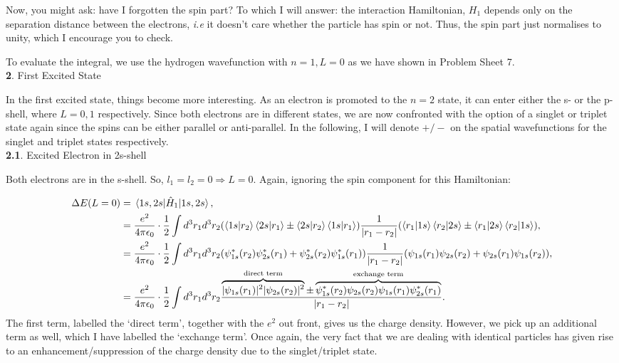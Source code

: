 \documentclass{article}
\numberwithin{equation}{section} %
\begin{document}
Now, you might ask: have I forgotten the spin part? To which I will answer: the interaction Hamiltonian, $H_1$ depends only on the separation distance between the electrons, \textit{i.e} it doesn't care whether the particle has spin or not. Thus, the spin part just normalises to unity, which I encourage you to check.

To evaluate the integral, we use the hydrogen wavefunction with $n=1, L=0$ as we have shown in Problem Sheet 7.\\

\noindent\textbf{2}. First Excited State

In the first excited state, things become more interesting. As an electron is promoted to the $n=2$ state, it can enter either the s- or the p-shell, where $L=0, 1$ respectively. Since both electrons are in different states, we are now confronted with the option of a singlet or triplet state again since the spins can be either parallel or anti-parallel. In the following, I will denote $+/-$ on the spatial wavefunctions for the singlet and triplet states respectively. \\

\noindent\textbf{2.1}. Excited Electron in 2s-shell

Both electrons are in the s-shell. So, $l_1=l_2=0 \Rightarrow L=0$. Again, ignoring the spin component for this Hamiltonian:

\begin{equation}
\begin{split}
\Delta E(L=0) &=\mel{1s,2s}{\hat{H}_1}{1s,2s},\\
&=\frac{e^2}{4\pi\epsilon_0}\cdot \frac{1}{2}\int d^3r_1d^3r_2 (\bra{1s}\ket{r_2}\bra{2s}\ket{r_1} \pm \bra{2s}\ket{r_2}\bra{1s}\ket{r_1})\frac{1}{\vert r_1-r_2\vert}(\bra{r_1}\ket{1s}\bra{r_2}\ket{2s} \pm \bra{r_1}\ket{2s}\bra{r_2}\ket{1s}),\\
&=\frac{e^2}{4\pi\epsilon_0}\cdot \frac{1}{2}\int d^3r_1d^3r_2 (\psi^*_{1s}(r_2)\psi^*_{2s}(r_1) + \psi^*_{2s}(r_2)\psi^*_{1s}(r_1))\frac{1}{\vert r_1-r_2\vert}(\psi_{1s}(r_1)\psi_{2s}(r_2) + \psi_{2s}(r_1)\psi_{1s}(r_2)),\\
&=\frac{e^2}{4\pi\epsilon_0}\cdot \frac{1}{2}\int d^3r_1d^3r_2 
\frac{\overbrace{\vert\psi_{1s}(r_1)\vert^2\vert\psi_{2s}(r_2)\vert^2}^{\text{direct term}} \pm \overbrace{\psi_{1s}^*(r_2)\psi_{2s}(r_2)\psi_{1s}(r_1)\psi^*_{2s}(r_1)}^{\text{exchange term}}}{\vert r_1-r_2\vert}.
\end{split}
\end{equation}
The first term, labelled the `direct term', together with the $e^2$ out front, gives us the charge density. However, we pick up an additional term as well, which I have labelled the `exchange term'. Once again, the very fact that we are dealing with identical particles has given rise to an enhancement/suppression of the charge density due to the singlet/triplet state.
\end{document}
